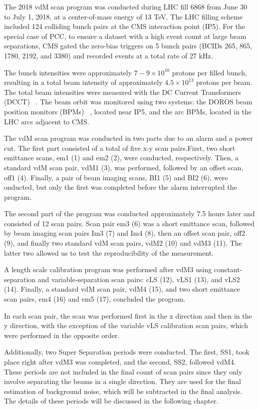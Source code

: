 The 2018 vdM scan program was conducted during LHC fill 6868 from June 30 to July 1, 2018, at a center-of-mass energy of 13 TeV. The LHC filling scheme included 124 colliding bunch pairs at the CMS interaction point (IP5). For the special case of PCC, to ensure a dataset with a high event count at large beam separations, CMS gated the zero-bias triggers on 5 bunch pairs (BCIDs 265, 865, 1780, 2192, and 3380) and recorded events at a total rate of 27 kHz.  

The bunch intensities were approximately \(7-9 \times 10^{10}\) protons per filled bunch, resulting in a total beam intensity of approximately \(4.5 \times 10^{13}\) protons per beam. The total beam intensities were measured with the DC Current Transformers (DCCT) ~\citep{LHC_DCCT_calibration}.  The beam orbit was monitored using two systems: the DOROS beam position monitors (BPMs) ~\citep{BPM__electronics}, located near IP5, and the arc BPMs, located in the LHC arcs adjacent to CMS.  

The vdM scan program was conducted in two parts due to an alarm and a power cut. The first part consisted of a total of five x-y scan pairs.First, two short emittance scans, em1 (1) and em2 (2), were conducted, respectively. Then, a standard vdM scan pair, vdM1 (3), was performed, followed by an offset scan, off1 (4). Finally, a pair of beam imaging scans, BI1 (5) and BI2 (6), were onducted, but only the first was completed before the alarm interrupted the program.  

The second part of the program was conducted approximately 7.5 hours later and consisted of 12 scan pairs. Scan pair em3 (6) was a short emittance scan, followed by beam imaging scan pairs Im3 (7) and Im4 (8), then an offset scan pair, off2 (9), and finally two standard vdM scan pairs, vdM2 (10) and vdM3 (11). The latter two allowed us to test the reproducibility of the measurement.  

A length scale calibration program was performed after vdM3 using constant-separation and variable-separation scan pairs: cLS (12), vLS1 (13), and vLS2 (14). Finally, a standard vdM scan pair, vdM4 (15), and two short emittance scan pairs, em4 (16) and em5 (17), concluded the program.  

In each scan pair, the scan was performed first in the x direction and then in the y direction, with the exception of the variable vLS calibration scan pairs, which were performed in the opposite order.  

Additionally, two Super Separation periods were conducted. The first, SS1, took place right after vdM3 was completed, and the second, SS2, followed vdM4. These periods are not included in the final count of scan pairs since they only involve separating the beams in a single direction. They are used for the final estimation of background noise, which will be subtracted in the final analysis. The details of these periods will be discussed in the following chapter.  

